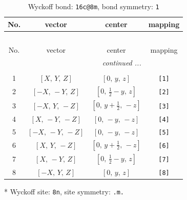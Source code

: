 \documentclass[fleqn,8pt]{jsarticle}
\begin{document}
\renewcommand{\arraystretch}{1.2}
\begin{longtable}{cccc}
\caption{Wyckoff bond: {\tt 16c@8m}, bond symmetry: {\tt 1}}
 \\
 \hline \hline
No. & vector & center & mapping \\ \hline \endfirsthead

\multicolumn{3}{l}{\tablename\ \thetable{}} \\
 \hline \hline
No. & vector & center & mapping \\ \hline \endhead

 \hline \hline
\multicolumn{3}{r}{\footnotesize\it continued ...} \\ \endfoot

 \hline \hline
\multicolumn{3}{r}{} \\ \endlastfoot

1 & $\left[ X,\, Y,\, Z \right]$ & $\left[ 0,\, y,\, z \right]$ & {\tt [1]} \\ \hline
2 & $\left[ - X,\, - Y,\, Z \right]$ & $\left[ 0,\, \frac{1}{2} - y,\, z \right]$ & {\tt [2]} \\ \hline
3 & $\left[ - X,\, Y,\, - Z \right]$ & $\left[ 0,\, y + \frac{1}{2},\, - z \right]$ & {\tt [3]} \\ \hline
4 & $\left[ X,\, - Y,\, - Z \right]$ & $\left[ 0,\, - y,\, - z \right]$ & {\tt [4]} \\ \hline
5 & $\left[ - X,\, - Y,\, - Z \right]$ & $\left[ 0,\, - y,\, - z \right]$ & {\tt [5]} \\ \hline
6 & $\left[ X,\, Y,\, - Z \right]$ & $\left[ 0,\, y + \frac{1}{2},\, - z \right]$ & {\tt [6]} \\ \hline
7 & $\left[ X,\, - Y,\, Z \right]$ & $\left[ 0,\, \frac{1}{2} - y,\, z \right]$ & {\tt [7]} \\ \hline
8 & $\left[ - X,\, Y,\, Z \right]$ & $\left[ 0,\, y,\, z \right]$ & {\tt [8]} \\
\end{longtable}
* Wyckoff site: {\tt 8n}, site symmetry: {\tt .m.}
\renewcommand{\arraystretch}{1.2}
\end{document}
